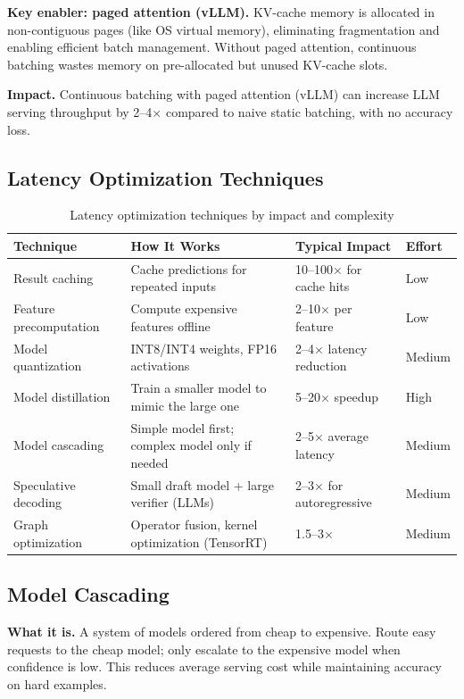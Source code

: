 \textbf{Key enabler: paged attention (vLLM).} KV-cache memory is allocated in non-contiguous pages (like OS virtual memory), eliminating fragmentation and enabling efficient batch management. Without paged attention, continuous batching wastes memory on pre-allocated but unused KV-cache slots.

\textbf{Impact.} Continuous batching with paged attention (vLLM) can increase LLM serving throughput by 2--4$\times$ compared to naive static batching, with no accuracy loss.

\subsection{Latency Optimization Techniques}

\begin{table}[H]
\centering
\caption{Latency optimization techniques by impact and complexity}
\begin{tabularx}{\textwidth}{lXXl}
\toprule
\textbf{Technique} & \textbf{How It Works} & \textbf{Typical Impact} & \textbf{Effort} \\
\midrule
Result caching & Cache predictions for repeated inputs & 10--100$\times$ for cache hits & Low \\
Feature precomputation & Compute expensive features offline & 2--10$\times$ per feature & Low \\
Model quantization & INT8/INT4 weights, FP16 activations & 2--4$\times$ latency reduction & Medium \\
Model distillation & Train a smaller model to mimic the large one & 5--20$\times$ speedup & High \\
Model cascading & Simple model first; complex model only if needed & 2--5$\times$ average latency & Medium \\
Speculative decoding & Small draft model + large verifier (LLMs) & 2--3$\times$ for autoregressive & Medium \\
Graph optimization & Operator fusion, kernel optimization (TensorRT) & 1.5--3$\times$ & Medium \\
\bottomrule
\end{tabularx}
\end{table}

\subsection{Model Cascading}

\textbf{What it is.} A system of models ordered from cheap to expensive. Route easy requests to the cheap model; only escalate to the expensive model when confidence is low. This reduces average serving cost while maintaining accuracy on hard examples.


